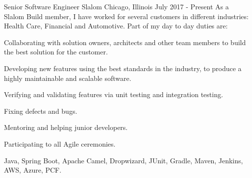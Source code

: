
\begin{cventries}

  \cventryfive
    {Senior Software Engineer} %
    {Slalom} %
    {Chicago, Illinois} %
    {July 2017 - Present} %
    {As a Slalom Build member, I have worked for several customers in different industries: Health Care, Financial and Automotive. Part of my day to day duties are:}
    {
      \begin{cvitems} %
      	\item {Collaborating with solution owners, architects and other team members to build the best solution for the customer.}
      	\item {Developing new features using the best standards in the industry, to produce a highly maintainable and scalable software.}
      	\item {Verifying and validating features via unit testing and integration testing.}
      	\item {Fixing defects and bugs.}
      	\item {Mentoring and helping junior developers.}
        \item {Participating to all Agile ceremonies.}
      \end{cvitems}
    }
    {Java, Spring Boot, Apache Camel, Dropwizard, JUnit, Gradle, Maven, Jenkins, AWS, Azure, PCF.}
  

\end{cventries}
